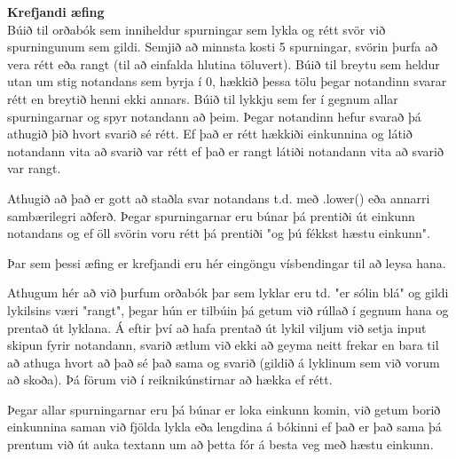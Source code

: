 \begin{exercise}\label{dic6}
	\textbf{Krefjandi æfing}\\
	Búið til orðabók sem inniheldur spurningar sem lykla og rétt svör við spurningunum sem gildi. 
	Semjið að minnsta kosti 5 spurningar, svörin þurfa að vera rétt eða rangt (til að einfalda hlutina töluvert).
	Búið til breytu sem heldur utan um stig notandans sem byrja í 0, hækkið þessa tölu þegar notandinn svarar rétt en breytið henni ekki annars. 
	Búið til lykkju sem fer í gegnum allar spurningarnar og spyr notandann að þeim.
	Þegar notandinn hefur svarað þá athugið þið hvort svarið sé rétt.
	Ef það er rétt hækkiði einkunnina og látið notandann vita að svarið var rétt ef það er rangt látiði notandann vita að svarið var rangt.
	
	Athugið að það er gott að staðla svar notandans t.d. með .lower() eða annarri sambærilegri aðferð. 
	Þegar spurningarnar eru búnar þá prentiði út einkunn notandans og ef öll svörin voru rétt þá prentiði "og þú fékkst hæstu einkunn".
\end{exercise}
\begin{Answer}[ref={dic6}]
	Þar sem þessi æfing er krefjandi eru hér eingöngu vísbendingar til að leysa hana.
	
	Athugum hér að við þurfum orðabók þar sem lyklar eru td. "er sólin blá" og gildi lykilsins væri "rangt", þegar hún er tilbúin þá getum við rúllað í gegnum hana og prentað út lyklana.
	Á eftir því að hafa prentað út lykil viljum við setja input skipun fyrir notandann, svarið ætlum við ekki að geyma neitt frekar en bara til að athuga hvort að það sé það sama og svarið (gildið á lyklinum sem við vorum að skoða).
	Þá förum við í reiknikúnstirnar að hækka ef rétt.
	
	Þegar allar spurningarnar eru þá búnar er loka einkunn komin, við getum borið einkunnina saman við fjölda lykla eða lengdina á bókinni ef það er það sama þá prentum við út auka textann um að þetta fór á besta veg með hæstu einkunn.
\end{Answer}

